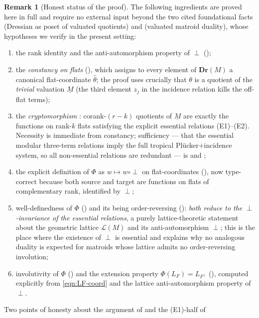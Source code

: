 \documentclass{article}
\theoremstyle{definition}
\newtheorem{remark}[theorem]{Remark}
\newcommand{\Dr}{\mathbf{Dr}}
\newcommand{\cLL}{\mathcal{L}}
\begin{document}
\begin{remark}[Honest status of the proof]\label{rmk:honest}
The following ingredients are proved here in full and require no external input beyond the two cited
foundational facts  (Dressian as poset of valuated quotients) and
 (valuated matroid duality), whose hypotheses we verify in the present setting:
\begin{enumerate}
\item the rank identity and the anti-automorphism property of $\perp$ ();
\item the \emph{constancy on flats} (), which assigns to every element of
$\Dr(M)$ a canonical flat-coordinate $\widehat\theta$; the proof uses crucially that $\theta$ is a
quotient of the \emph{trivial} valuation $\underline M$ (the third element $z_j$ in the incidence
relation kills the off-flat terms);
\item the \emph{cryptomorphism} : corank-$(r-k)$ quotients of
$\underline M$ are exactly the functions on rank-$k$ flats satisfying the explicit essential
relations (E1)--(E2). Necessity is immediate from constancy; sufficiency --- that the essential
modular three-term relations imply the full tropical Pl\"ucker$+$incidence system, so all
non-essential relations are redundant --- is  and ;
\item the explicit definition of $\Phi$ as $w\mapsto w\circ\perp$ on flat-coordinates
(), now type-correct because both source and target are functions on flats of
complementary rank, identified by $\perp$;
\item well-definedness of $\Phi$ () and its being order-reversing ():
\emph{both reduce to the $\perp$-invariance of the essential relations}, a purely lattice-theoretic
statement about the geometric lattice $\cLL(M)$ and its anti-automorphism $\perp$; this is the place
where the existence of $\perp$ is essential and explains why no analogous duality is expected for
matroids whose lattice admits no order-reversing involution;
\item involutivity of $\Phi$ () and the extension property $\Phi(L_F)=L_{F^{\perp}}$
(), computed explicitly from \eqref{eqn:LF-coord} and the lattice anti-automorphism
property of $\perp$.
\end{enumerate}
Two points of honesty about the argument of  and the (E1)-half of

\end{remark}
\end{document}
